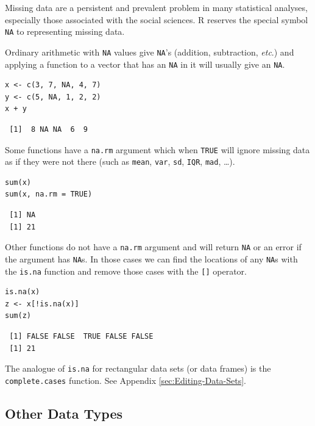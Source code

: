 \documentclass[captions=tableheading]{scrbook}
\begin{document}
\label{sub:Missing-Data}

Missing data are a persistent and prevalent problem in many statistical analyses, especially those associated with the social sciences. \textsf{R} reserves the special symbol \texttt{NA} to representing missing data.

Ordinary arithmetic with \texttt{NA} values give \texttt{NA}'s (addition, subtraction, \emph{etc}.) and applying a function to a vector that has an \texttt{NA} in it will usually give an \texttt{NA}.


\begin{verbatim}
x <- c(3, 7, NA, 4, 7)
y <- c(5, NA, 1, 2, 2)
x + y
\end{verbatim}

\begin{verbatim}
 [1]  8 NA NA  6  9
\end{verbatim}

Some functions have a \texttt{na.rm} argument which when \texttt{TRUE} will ignore missing data as if they were not there (such as \texttt{mean}, \texttt{var}, \texttt{sd}, \texttt{IQR}, \texttt{mad}, \ldots{}). 


\begin{verbatim}
sum(x)
sum(x, na.rm = TRUE)
\end{verbatim}

\begin{verbatim}
 [1] NA
 [1] 21
\end{verbatim}

Other functions do not have a \texttt{na.rm} argument and will return \texttt{NA} or an error if the argument has \texttt{NA}s. In those cases we can find the locations of any \texttt{NA}s with the \texttt{is.na} function and remove those cases with the \texttt{[]} operator.


\begin{verbatim}
is.na(x)
z <- x[!is.na(x)]
sum(z)
\end{verbatim}

\begin{verbatim}
 [1] FALSE FALSE  TRUE FALSE FALSE
 [1] 21
\end{verbatim}

The analogue of \texttt{is.na} for rectangular data sets (or data frames) is the \texttt{complete.cases} function. See Appendix \ref{sec:Editing-Data-Sets}.
\subsection{Other Data Types}
\label{sec-3-1-7}
\end{document}
